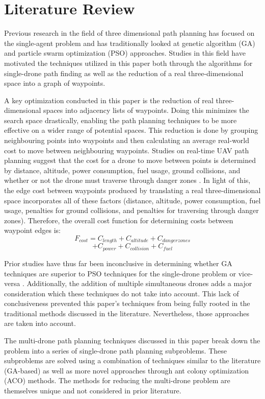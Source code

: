 \documentclass[conference]{IEEEtran}
\begin{document}
\section{Literature Review}
Previous research in the field of three dimensional path planning has focused on the single-agent problem and has traditionally looked at genetic algorithm (GA) and particle swarm optimization (PSO) approaches. Studies in this field have motivated the techniques utilized in this paper both through the algorithms for single-drone path finding as well as the reduction of a real three-dimensional space into a graph of waypoints.

A key optimization conducted in this paper is the reduction of real three-dimensional spaces into adjacency lists of waypoints. Doing this minimizes the search space drastically, enabling the path planning techniques to be more effective on a wider range of potential spaces. This reduction is done by grouping neighbouring points into waypoints and then calculating an average real-world cost to move between neighbouring waypoints. Studies on real-time UAV path planning suggest that the cost for a drone to move between points is determined by distance, altitude, power consumption, fuel usage, ground collisions, and whether or not the drone must traverse through danger zones \cite{b1}. In light of this, the edge cost between waypoints produced by translating a real three-dimensional space incorporates
all of these factors (distance, altitude, power consumption, fuel usage, penalties for ground collisions, and penalties for traversing through danger zones). Therefore, the overall cost function for determining costs between waypoint edges is:
$$F_{cost} = C_{length} + C_{altitude} + C_{danger zones}$$
$$ + C_{power} + C_{collision} + C_{fuel}$$

Prior studies have thus far been inconclusive in determining whether GA techniques are superior to PSO techniques for the single-drone problem \cite{b2} or vice-versa \cite{b3}. Additionally, the addition of multiple simultaneous drones adds a major consideration which these techniques do not take into account. This lack of conclusiveness prevented this paper's techniques from being fully rooted in the traditional methods discussed in the literature. Nevertheless, those approaches are taken into account.

The multi-drone path planning techniques discussed in this paper break down the problem into a series of single-drone path planning subproblems. These subproblems are solved using a combination of techniques similar to the literature (GA-based) as well as more novel approaches through ant colony optimization (ACO) methods. The methods for reducing the multi-drone problem are themselves unique and not considered in prior literature.
\end{document}
